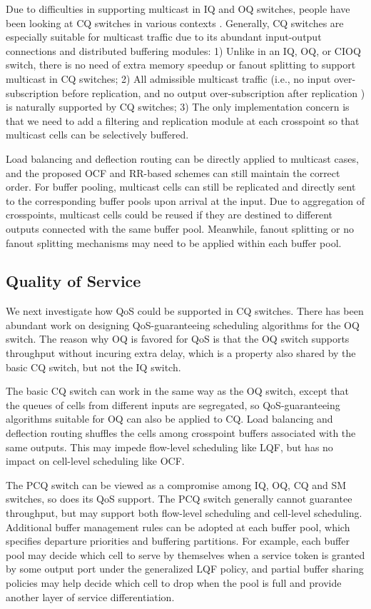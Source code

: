 \documentclass[journal,final,doublecolumn,10pt,twoside]{IEEEtranTCOM} \normalsize
\begin{document}
Due to difficulties in supporting multicast in IQ and OQ switches, people have been looking at CQ switches in various contexts \cite{smoothscheduling,cqmulticast1}. Generally, CQ switches are especially suitable for multicast traffic due to its abundant input-output connections and distributed buffering modules:
1) Unlike in an IQ, OQ, or CIOQ switch, there is no need of extra memory speedup or fanout splitting to support multicast in CQ switches;
2) All admissible multicast traffic (i.e., no input over-subscription before replication, and no output over-subscription after replication \cite{multicast}) is naturally supported by CQ switches;
3) The only implementation concern is that we need to add a filtering and replication module at each crosspoint so that multicast cells can be selectively buffered.

Load balancing and deflection routing can be directly applied to multicast cases, and the proposed OCF and RR-based schemes can still maintain the correct order. For buffer pooling, multicast cells can still be replicated and directly sent to the corresponding buffer pools upon arrival at the input. Due to aggregation of crosspoints, multicast cells could be reused if they are destined to different outputs connected with the same buffer pool. Meanwhile, fanout splitting or no fanout splitting mechanisms may need to be applied within each buffer pool. 



\subsection{Quality of Service}
We next investigate how QoS could be supported in CQ switches. There has been abundant work on designing QoS-guaranteeing scheduling algorithms for the OQ switch. The reason why OQ is favored for QoS is that the OQ switch supports  throughput without incuring extra delay, which is a property also shared by the basic CQ switch, but not the IQ switch. 

The basic CQ switch can work in the same way as the OQ switch, except that the queues of cells from different inputs are segregated, so QoS-guaranteeing algorithms suitable for OQ can also be applied to CQ. Load balancing and deflection routing shuffles the cells among crosspoint buffers associated with the same outputs. This may impede flow-level scheduling like LQF, but has no impact on cell-level scheduling like OCF.

The PCQ switch can be viewed as a compromise among IQ, OQ, CQ and SM switches, so does its QoS support. The PCQ switch generally cannot guarantee  throughput, but may support both flow-level scheduling and cell-level scheduling. Additional buffer management rules can be adopted at each buffer pool, which specifies departure priorities and buffering partitions. For example, each buffer pool may decide which cell to serve by themselves when a service token is granted by some output port under the generalized LQF policy, and partial buffer sharing policies \cite{partitionsurvey} may help decide which cell to drop when the pool is full and provide another layer of service differentiation.
\end{document}
